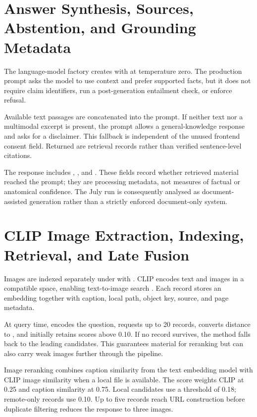 \section{Answer Synthesis, Sources, Abstention, and Grounding Metadata}
\label{sec:answer-synthesis}

The language-model factory creates  with  at temperature zero. The production prompt asks the model to use context and prefer supported facts, but it does not require claim identifiers, run a post-generation entailment check, or enforce refusal.

Available text passages are concatenated into the prompt. If neither text nor a multimodal excerpt is present, the prompt allows a general-knowledge response and asks for a disclaimer. This fallback is independent of the unused frontend consent field. Returned  are retrieval records rather than verified sentence-level citations.

The response includes , , and . These fields record whether retrieved material reached the prompt; they are processing metadata, not measures of factual or anatomical confidence. The July run is consequently analysed as document-assisted generation rather than a strictly enforced document-only system.

\section{CLIP Image Extraction, Indexing, Retrieval, and Late Fusion}
\label{sec:clip-pipeline}

Images are indexed separately under  with . CLIP encodes text and images in a compatible space, enabling text-to-image search \parencite{radford2021}. Each record stores an embedding together with caption, local path, object key, source, and page metadata.

At query time,  encodes the question, requests up to 20 records, converts distance to , and initially retains scores above 0.10. If no record survives, the method falls back to the leading candidates. This guarantees material for reranking but can also carry weak images further through the pipeline.

Image reranking combines caption similarity from the text embedding model with CLIP image similarity when a local file is available. The score weights CLIP at 0.25 and caption similarity at 0.75. Local candidates use a threshold of 0.18; remote-only records use 0.10. Up to five records reach URL construction before duplicate filtering reduces the response to three images.


